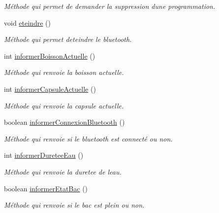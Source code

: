 \begin{DoxyCompactItemize}
\begin{DoxyCompactList}\small\item\em Méthode qui permet de demander la suppression d\textquotesingle{}une programmation. \end{DoxyCompactList}\item 
void \hyperlink{classcom_1_1example_1_1ekawa_1_1_cafetiere_acca6b757d8fad0d0faf64f3266557ca2}{eteindre} ()
\begin{DoxyCompactList}\small\item\em Méthode qui permet d\textquotesingle{}eteindre le bluetooth. \end{DoxyCompactList}\item 
int \hyperlink{classcom_1_1example_1_1ekawa_1_1_cafetiere_aa7022512d5a36d2b911722ae6400379f}{informer\+Boisson\+Actuelle} ()
\begin{DoxyCompactList}\small\item\em Méthode qui renvoie la boisson actuelle. \end{DoxyCompactList}\item 
int \hyperlink{classcom_1_1example_1_1ekawa_1_1_cafetiere_a3251d1865f3a4113553e1743a971984d}{informer\+Capsule\+Actuelle} ()
\begin{DoxyCompactList}\small\item\em Méthode qui renvoie la capsule actuelle. \end{DoxyCompactList}\item 
boolean \hyperlink{classcom_1_1example_1_1ekawa_1_1_cafetiere_a97d9ca4701a961fe8865ecfa1d5bf64a}{informer\+Connexion\+Bluetooth} ()
\begin{DoxyCompactList}\small\item\em Méthode qui renvoie si le bluetooth est connecté ou non. \end{DoxyCompactList}\item 
int \hyperlink{classcom_1_1example_1_1ekawa_1_1_cafetiere_a078b7b5343bfbc06dec35dbd8fb292be}{informer\+Duretee\+Eau} ()
\begin{DoxyCompactList}\small\item\em Méthode qui renvoie la duretee de l\textquotesingle{}eau. \end{DoxyCompactList}\item 
boolean \hyperlink{classcom_1_1example_1_1ekawa_1_1_cafetiere_a1e5aad72cec77a755c8b70eb1be5e6e5}{informer\+Etat\+Bac} ()
\begin{DoxyCompactList}\small\item\em Méthode qui renvoie si le bac est plein ou non. \end{DoxyCompactList}\item 

\end{DoxyCompactItemize}
